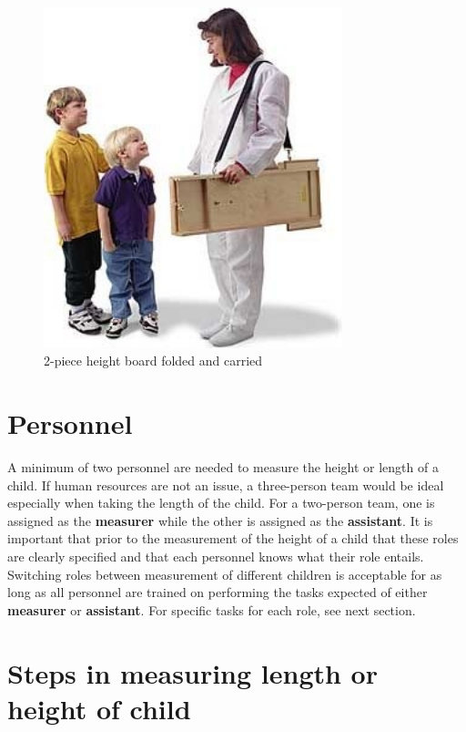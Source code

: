 \documentclass[
  12pt,
]{book}
\begin{document}
\begin{figure}

{\centering \includegraphics[width=3.42in]{images/ShorrBrdcarry} 

}

\caption{2-piece height board folded and carried}\label{fig:height03}
\end{figure}

\hypertarget{personnel-1}{%
\section{Personnel}\label{personnel-1}}

A minimum of two personnel are needed to measure the height or length of a child. If human resources are not an issue, a three-person team would be ideal especially when taking the length of the child. For a two-person team, one is assigned as the \textbf{measurer} while the other is assigned as the \textbf{assistant}. It is important that prior to the measurement of the height of a child that these roles are clearly specified and that each personnel knows what their role entails. Switching roles between measurement of different children is acceptable for as long as all personnel are trained on performing the tasks expected of either \textbf{measurer} or \textbf{assistant}. For specific tasks for each role, see next section.

\hypertarget{steps-in-measuring-length-or-height-of-child}{%
\section{Steps in measuring length or height of child}\label{steps-in-measuring-length-or-height-of-child}}
\end{document}
